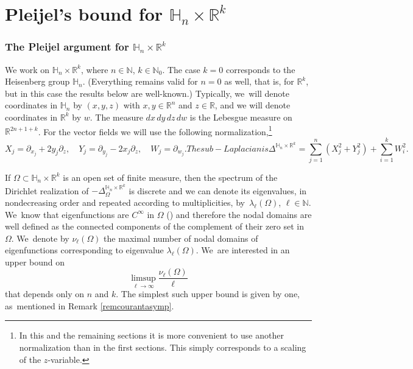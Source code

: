 \documentclass[11pt]{article}
\theoremstyle{definition}
\newcommand{\1}{\mathbbm{1}}
\newcommand{\N}{\mathbb{N}}
\newcommand{\R}{\mathbb{R}}
\numberwithin{equation}{section}
\begin{document}
\part{Pleijel's bound for \texorpdfstring{$\mathbb H_n\times\R^k$}{HnRk}}\label{part2}

\section{The Pleijel argument for \texorpdfstring{$\mathbb H_n\times\R^k$}{HnRk} }\label{sec:mainhnrk}

We work on $\mathbb H_n\times\R^k$, where $n\in\N$, $k\in\N_0$. The case $k=0$ corresponds to the Heisenberg group $\mathbb H_n$. (Everything remains valid for $n=0$ as well, that is, for $\R^k$, but in this case the results below are well-known.) Typically, we~will denote coordinates in $\mathbb H_n$ by $(x,y,z)$ with $x,y\in\R^n$ and $z\in\R$, and we will denote coordinates in $\R^k$ by $w$. The measure $dx\,dy\,dz\,dw$ is the Lebesgue measure on $\R^{2n+1+k}$. For the vector fields we will use the following normalization,\footnote{In this and the remaining sections it is more convenient to use another normalization than in the first sections. This simply corresponds to a scaling of the $z$-variable.}
\begin{subequations}\label{Otherformulation}
\begin{equation}
X_j = \partial_{x_j} + 2y_j \partial_z,\quad
Y_j = \partial_{y_j} - 2x_j \partial_z,\quad
W_j = \partial_{w_j}.
\end{equation}
The sub-Laplacian is
\begin{equation}
\Delta^{\mathbb H_n\times\R^k} = \sum_{j=1}^n (X_j^2 + Y_j^2) + \sum_{i=1}^k W_i^2.
\end{equation}
\end{subequations}

If $\Omega\subset\mathbb H_n\times\R^k$ is an open set of finite measure, then the spectrum of the Dirichlet realization of $ -\Delta^{\mathbb H_n\times\R^k}_\Omega $ is discrete and we can denote its eigenvalues, in nondecreasing order and repeated according to multiplicities, by~$\lambda_\ell(\Omega)$, $\ell\in\N$. We~know that eigenfunctions are $C^\infty$ in $\Omega$ (\cite{Ho}) and therefore the nodal domains are well defined as the connected components of the complement of their zero set in $\Omega$. We~denote by $\nu_\ell(\Omega)$ the maximal number of nodal domains of eigenfunctions corresponding to eigenvalue $\lambda_\ell(\Omega)$. We~are interested in an upper bound on
\[
\limsup_{\ell\to\infty} \frac{\nu_\ell(\Omega)}{\ell}
\]
that depends only on $n$ and $k$. The simplest such upper bound is given by one, as~mentioned in Remark \ref{remcourantasymp}.
\end{document}

